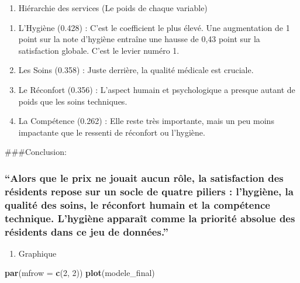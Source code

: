 \documentclass[
]{article}
\newenvironment{Shaded}{\begin{snugshade}}{\end{snugshade}}
\newcommand{\AttributeTok}[1]{\textcolor[rgb]{0.13,0.29,0.53}{#1}}
\newcommand{\DecValTok}[1]{\textcolor[rgb]{0.00,0.00,0.81}{#1}}
\newcommand{\FunctionTok}[1]{\textcolor[rgb]{0.13,0.29,0.53}{\textbf{#1}}}
\newcommand{\NormalTok}[1]{#1}
\providecommand{\tightlist}{%
  \setlength{\itemsep}{0pt}\setlength{\parskip}{0pt}}
\begin{document}
\begin{enumerate}
\def\labelenumi{\arabic{enumi}.}
\setcounter{enumi}{1}
\tightlist
\item
  Hiérarchie des services (Le poids de chaque variable)
\end{enumerate}

\begin{enumerate}
\def\labelenumi{\alph{enumi})}
\item
  L'Hygiène (0.428) : C'est le coefficient le plus élevé. Une
  augmentation de 1 point sur la note d'hygiène entraîne une hausse de
  0,43 point sur la satisfaction globale. C'est le levier numéro 1.
\item
  Les Soins (0.358) : Juste derrière, la qualité médicale est cruciale.
\item
  Le Réconfort (0.356) : L'aspect humain et psychologique a presque
  autant de poids que les soins techniques.
\item
  La Compétence (0.262) : Elle reste très importante, mais un peu moins
  impactante que le ressenti de réconfort ou l'hygiène.
\end{enumerate}

\#\#\#Conclusion:

\subsubsection{``Alors que le prix ne jouait aucun rôle, la satisfaction
des résidents repose sur un socle de quatre piliers : l'hygiène, la
qualité des soins, le réconfort humain et la compétence technique.
L'hygiène apparaît comme la priorité absolue des résidents dans ce jeu
de
données.''}\label{alors-que-le-prix-ne-jouait-aucun-ruxf4le-la-satisfaction-des-ruxe9sidents-repose-sur-un-socle-de-quatre-piliers-lhygiuxe8ne-la-qualituxe9-des-soins-le-ruxe9confort-humain-et-la-compuxe9tence-technique.-lhygiuxe8ne-apparauxeet-comme-la-priorituxe9-absolue-des-ruxe9sidents-dans-ce-jeu-de-donnuxe9es.}

\begin{enumerate}
\def\labelenumi{\arabic{enumi})}
\setcounter{enumi}{2}
\tightlist
\item
  Graphique
\end{enumerate}

\begin{Shaded}
\begin{Highlighting}[]
\FunctionTok{par}\NormalTok{(}\AttributeTok{mfrow =} \FunctionTok{c}\NormalTok{(}\DecValTok{2}\NormalTok{, }\DecValTok{2}\NormalTok{)) }
\FunctionTok{plot}\NormalTok{(modele\_final)}
\end{Highlighting}
\end{Shaded}
\end{document}

